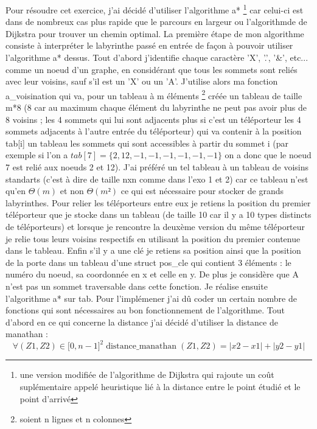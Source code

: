 \documentclass[a4paper, 11pt]{report}
\DeclareMathOperator{\distanceman}{distance\_manathan}
\begin{document}
\vspace{2\baselineskip}
Pour résoudre cet exercice, j'ai décidé d'utiliser l'algorithme a* \footnote {une version modifiée de l'algorithme de Dijkstra qui rajoute un coût suplémentaire appelé heuristique lié à la distance entre le point étudié et le point d'arrivé} car celui-ci est dans de nombreux cas plus rapide que le parcours en largeur ou l'algorithmde de Dijkstra pour trouver un chemin optimal.
\newline
La première étape de mon algorithme consiste à interpréter le labyrinthe passé en entrée de façon à pouvoir utiliser l'algorithme a* dessus. Tout d'abord j'identifie chaque caractère 'X', '.', '\&', etc... comme un noeud d'un graphe, en considérant que tous les sommets sont reliés avec leur voisins, sauf s'il est un 'X' ou un 'A'. J'utilise alors ma fonction a\_voisination qui va, pour un tableau à m éléments \footnote{soient n lignes et n colonnes} créée un tableau de taille m*8 (8 car au maximum chaque élément du labyrinthe ne peut pas avoir plus de 8 voisins ; les 4 sommets qui lui sont adjacents plus si c'est un téléporteur les 4 sommets adjacents à l'autre entrée du téléporteur) qui va contenir à la position tab[i] un tableau les sommets qui sont accessibles à partir du sommet i (par exemple si l'on a $tab[7] = \{2, 12, -1, -1, -1, -1, -1, -1\}$ on a donc que le noeud 7 est relié aux noeuds 2 et 12). J'ai préféré un tel tableau à un tableau de voisins standarts (c'est à dire de taille nxn comme dans l'exo 1 et 2) car ce tableau n'est qu'en $\Theta(m)$ et non $\Theta(m²)$ ce qui est nécessaire pour stocker de grands labyrinthes. Pour relier les téléporteurs entre eux je retiens la position du premier téléporteur que je stocke dans un tableau (de taille 10 car il y a 10 types distincts de téléporteurs) et lorsque je rencontre la deuxème version du même téléporteur  je relie tous leurs voisins respectifs en utilisant la position du premier contenue dans le tableau. Enfin s'il y a une clé je retiens sa position ainsi que la position de la porte dans un tableau d'une struct pos\_cle qui contient 3 éléments : le numéro du noeud, sa coordonnée en x et celle en y. De plus je considère que A n'est pas un sommet traversable dans cette fonction.
\newline
Je réalise ensuite l'algorithme a* sur tab. Pour l'implémener j'ai dû coder un certain nombre de fonctions qui sont nécessaires au bon fonctionnement de l'algorithme. Tout d'abord en ce qui concerne la distance j'ai décidé d'utiliser la distance de manathan :
\[ \forall (Z1, Z2) \in \lbrack 0, n - 1 \rbrack ^{2}\distanceman(Z1, Z2) = |x2 - x1| + |y2 - y1| \]
\end{document}

